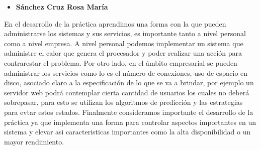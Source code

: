 
\begin{itemize}
\item \textbf{Sánchez Cruz Rosa María}
\end{itemize}
En el desarrollo de la práctica aprendimos una forma con la que pueden administrarse los sistemas y sus servicios, es importante tanto a nivel personal como a nivel empresa.
A nivel personal podemos implementar un sistema que administre el calor que genera el procesador y poder realizar una acción para contrarestar el problema. Por otro lado, en el ámbito empresarial se pueden administrar los servicios como lo es el número de conexiones, uso de espacio en disco, asociado claro a la especificación de lo que se va a brindar, por ejemplo un servidor web podrá contemplar cierta cantidad de usuarios los cuales no deberá sobrepasar, para esto se utilizan los algoritmos de predicción y las estrategias para evtar estos estados. 
Finalmente consideramos importante el desarrollo de la práctica ya que implementa una forma para controlar aspectos importantes en un sistema y elevar asi caracteristicas importantes como la alta disponibilidad o un mayor rendimiento.